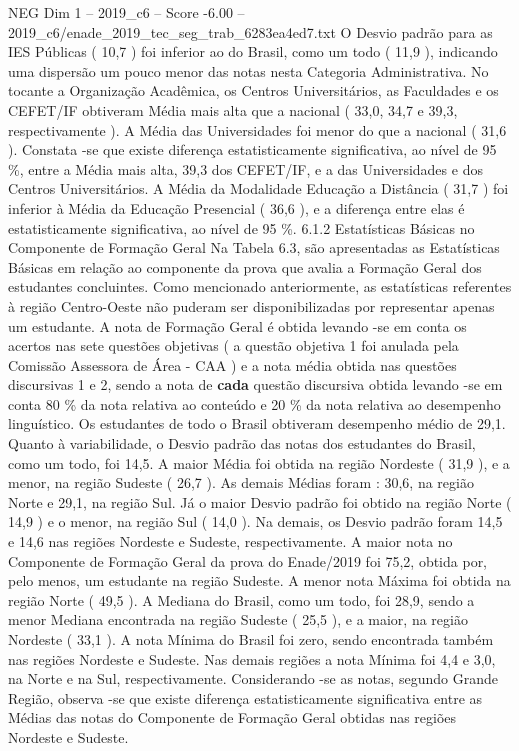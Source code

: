 \begin{textsample}{NEG Dim 1 – 2019\_c6 – Score -6.00 – 2019\_c6/enade\_2019\_tec\_seg\_trab\_6283ea4ed7.txt}
O Desvio padrão para as IES Públicas ( 10,7 ) foi inferior ao do Brasil, como um todo ( 11,9 ), indicando uma dispersão um pouco menor das notas nesta Categoria Administrativa.
No tocante a Organização Acadêmica, os Centros Universitários, as Faculdades e os CEFET/IF obtiveram Média mais alta que a nacional ( 33,0, 34,7 e 39,3, respectivamente ).
A Média das Universidades foi menor do que a nacional ( 31,6 ).
Constata -se que existe diferença estatisticamente significativa, ao nível de 95 \%, entre a Média mais alta, 39,3 dos CEFET/IF, e a das Universidades e dos Centros Universitários.
A Média da Modalidade Educação a Distância ( 31,7 ) foi inferior à Média da Educação Presencial ( 36,6 ), e a diferença entre elas é estatisticamente significativa, ao nível de 95 \%. 6.1.2 Estatísticas Básicas no Componente de Formação Geral Na Tabela 6.3, são apresentadas as Estatísticas Básicas em relação ao componente da prova que avalia a Formação Geral dos estudantes concluintes.
Como mencionado anteriormente, as estatísticas referentes à região Centro-Oeste não puderam ser disponibilizadas por representar apenas um estudante.
A nota de Formação Geral é obtida levando -se em conta os acertos nas sete questões objetivas ( a questão objetiva 1 foi anulada pela Comissão Assessora de Área - CAA ) e a nota média obtida nas questões discursivas 1 e 2, sendo a nota de \textbf{cada} questão discursiva obtida levando -se em conta 80 \% da nota relativa ao conteúdo e 20 \% da nota relativa ao desempenho linguístico.
Os estudantes de todo o Brasil obtiveram desempenho médio de 29,1.
Quanto à variabilidade, o Desvio padrão das notas dos estudantes do Brasil, como um todo, foi 14,5.
A maior Média foi obtida na região Nordeste ( 31,9 ), e a menor, na região Sudeste ( 26,7 ).
As demais Médias foram : 30,6, na região Norte e 29,1, na região Sul.
Já o maior Desvio padrão foi obtido na região Norte ( 14,9 ) e o menor, na região Sul ( 14,0 ).
Na demais, os Desvio padrão foram 14,5 e 14,6 nas regiões Nordeste e Sudeste, respectivamente.
A maior nota no Componente de Formação Geral da prova do Enade/2019 foi 75,2, obtida por, pelo menos, um estudante na região Sudeste.
A menor nota Máxima foi obtida na região Norte ( 49,5 ).
A Mediana do Brasil, como um todo, foi 28,9, sendo a menor Mediana encontrada na região Sudeste ( 25,5 ), e a maior, na região Nordeste ( 33,1 ).
A nota Mínima do Brasil foi zero, sendo encontrada também nas regiões Nordeste e Sudeste.
Nas demais regiões a nota Mínima foi 4,4 e 3,0, na Norte e na Sul, respectivamente.
Considerando -se as notas, segundo Grande Região, observa -se que existe diferença estatisticamente significativa entre as Médias das notas do Componente de Formação Geral obtidas nas regiões Nordeste e Sudeste.

\end{textsample}
